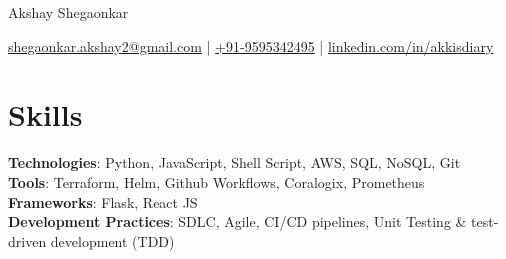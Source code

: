 \documentclass[11pt]{article}       %
\begin{document}
\centerline{\Huge Akshay Shegaonkar}

\vspace{5pt}

\centerline{\href{mailto:shegaonkar.akshay2@gmail.com}{shegaonkar.akshay2@gmail.com} | \href{tel:+919595342495}{+91-9595342495} | \href{https://www.linkedin.com/in/akkisdiary}{linkedin.com/in/akkisdiary}}

\vspace{-10pt}

\section*{Skills}
\textbf{Technologies}: Python, JavaScript, Shell Script, AWS, SQL, NoSQL, Git \\
\textbf{Tools}: Terraform, Helm, Github Workflows, Coralogix, Prometheus \\
\textbf{Frameworks}: Flask, React JS \\
\textbf{Development Practices}: SDLC, Agile, CI/CD pipelines, Unit Testing \& test-driven development (TDD)
\vspace{-6.5pt}

\end{document}
